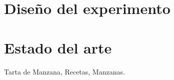 \documentclass[a4,papper]{IEEEtran}
\begin{document}
\section{Diseño del experimento}
\IEEEPARstart{}





\section{Estado del arte}
\IEEEPARstart{}




\begin{IEEEkeywords}
Tarta de Manzana, Recetas, Manzanas.
\end{IEEEkeywords}
 
\end{document}
